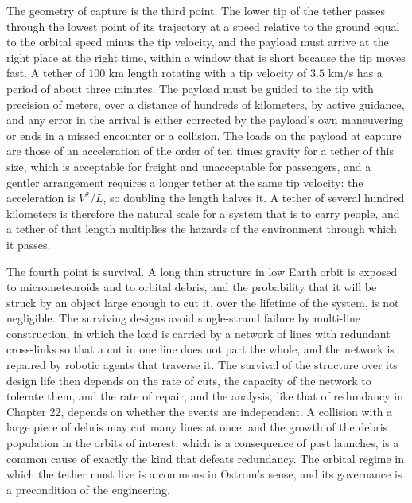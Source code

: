 The geometry of capture is the third point. The lower tip of the tether passes through the lowest point of its trajectory at a speed relative to the ground equal to the orbital speed minus the tip velocity, and the payload must arrive at the right place at the right time, within a window that is short because the tip moves fast. A tether of $100$ km length rotating with a tip velocity of $3.5$ km/s has a period of about three minutes. The payload must be guided to the tip with precision of meters, over a distance of hundreds of kilometers, by active guidance, and any error in the arrival is either corrected by the payload's own maneuvering or ends in a missed encounter or a collision. The loads on the payload at capture are those of an acceleration of the order of ten times gravity for a tether of this size, which is acceptable for freight and unacceptable for passengers, and a gentler arrangement requires a longer tether at the same tip velocity: the acceleration is $V^2/L$, so doubling the length halves it. A tether of several hundred kilometers is therefore the natural scale for a system that is to carry people, and a tether of that length multiplies the hazards of the environment through which it passes.

The fourth point is survival. A long thin structure in low Earth orbit is exposed to micrometeoroids and to orbital debris, and the probability that it will be struck by an object large enough to cut it, over the lifetime of the system, is not negligible. The surviving designs avoid single-strand failure by multi-line construction, in which the load is carried by a network of lines with redundant cross-links so that a cut in one line does not part the whole, and the network is repaired by robotic agents that traverse it. The survival of the structure over its design life then depends on the rate of cuts, the capacity of the network to tolerate them, and the rate of repair, and the analysis, like that of redundancy in Chapter 22, depends on whether the events are independent. A collision with a large piece of debris may cut many lines at once, and the growth of the debris population in the orbits of interest, which is a consequence of past launches, is a common cause of exactly the kind that defeats redundancy. The orbital regime in which the tether must live is a commons in Ostrom's sense, and its governance is a precondition of the engineering.

